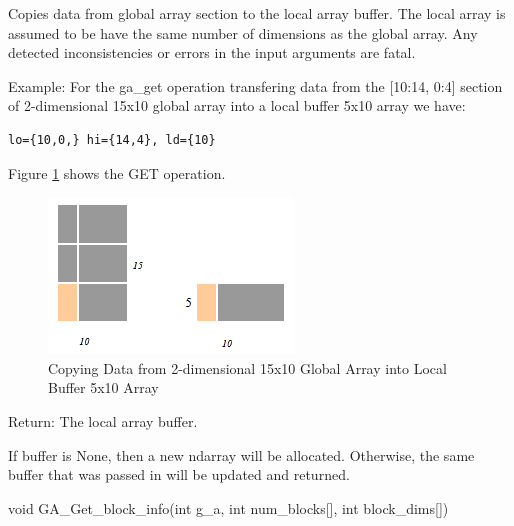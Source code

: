 \documentclass[12pt]{article}
\begin{document}
\ncoll

\begin{desc}

Copies data from global array section to the local array buffer. The local
array is assumed to be have the same number of dimensions as the global array.
Any detected inconsistencies or errors in the input arguments are fatal.

Example: For the ga_get operation transfering data from the [10:14, 0:4]
section of 2-dimensional 15x10 global array into a local buffer 5x10 array we
have:

\begin{verbatim}
lo={10,0,} hi={14,4}, ld={10}
\end{verbatim}

Figure \ref{get} shows the GET operation.

\begin{figure}
\centering
\includegraphics{get}
\caption{Copying Data from 2-dimensional 15x10 Global Array into Local Buffer 5x10 Array}
\label{get}
\end{figure}

Return: The local array buffer.

\end{desc}

\begin{pydesc}
If buffer is None, then a new ndarray will be allocated. Otherwise, the same
buffer that was passed in will be updated and returned.
\end{pydesc}


\begin{capi}
\begin{ccode}
void GA_Get_block_info(int g_a, int num_blocks[], int block_dims[])
\end{ccode}
\begin{funcargs}
\end{funcargs}
\end{capi}
\end{document}

